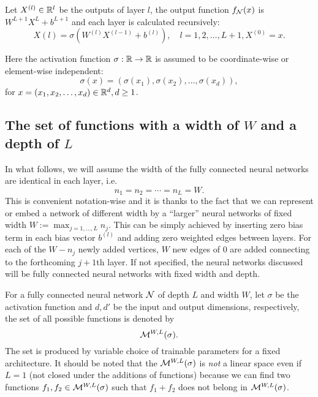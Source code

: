 Let $X^{(l)} \in \mathbb{R}^l$ be the outputs of layer $l$, the output function
$f_{\mathcal{N}}(x)$ is $W^{L+1} X^{L} + b^{L+1}$ and each layer is calculated
recursively:
\begin{equation}
    X(l) = \sigma(W^{(l)} X^{(l-1)} + b^{(l)}), 
    \quad l = 1, 2, \dots, L+1, X^{(0)} = x.
\end{equation}

Here the activation function $\sigma: \mathbb{R} \to \mathbb{R}$ is assumed to be
coordinate-wise or element-wise independent:
\begin{equation}
    \sigma(x) = (\sigma(x_1), \sigma(x_2), \dots, \sigma(x_d)),
\end{equation}
for $x = (x_1, x_2, \dots, x_d) \in \mathbb{R}^d, d \geq 1$.

\subsection{The set of functions with a width of $W$ and a depth of $L$}

In what follows, we will assume the width of the fully connected neural networks
are identical in each layer, i.e.
\begin{equation}
    n_1 = n_2 = \cdots = n_L = W.
\end{equation}
This is convenient notation-wise and it is thanks to the fact that we can
represent or embed a network of different width by a ``larger'' neural networks
of fixed width $W := \max_{j=1,\dots,L} n_j$. This can be simply achieved by
inserting zero bias term in each bias vector $b^{(l)}$ and adding zero weighted
edges between layers. For each of the $W-n_j$ newly added vertices, $W$ new
edges of $0$ are added connecting to the forthcoming $j+1$th layer. If not
specified, the neural networks discussed will be fully connected neural networks
with fixed width and depth.

For a fully connected neural network $\mathcal{N}$ of depth $L$ and width $W$, let
$\sigma$ be the activation function and $d, d'$ be the input and output
dimensions, respectively, the set of all possible functions is denoted by
\begin{equation}
    \mathcal{M}^{W,L}(\sigma).
\end{equation}
The set is produced by variable choice of trainable parameters for a fixed
architecture. It should be noted that the $\mathcal{M}^{W,L}(\sigma)$ is
\textit{not} a linear space even if $L=1$ (not closed under the additions of
functions) because we can find two functions $f_1, f_2 \in
\mathcal{M}^{W,L}(\sigma)$ such that $f_1 + f_2$ does not belong in
$\mathcal{M}^{W,L}(\sigma)$.

